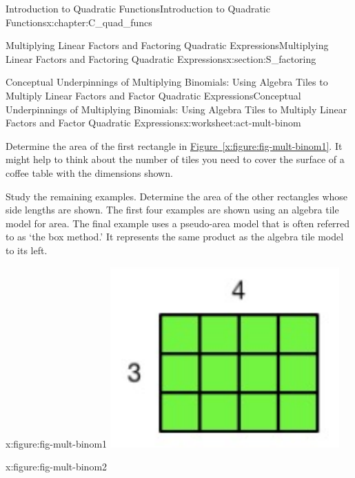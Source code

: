 \documentclass[oneside,10pt,]{book}
\newcommand{\xreffont}{\relax}
\numberwithin{equation}{chapter}
\begin{document}
\begin{chapterptx}{Introduction to Quadratic Functions}{}{Introduction to Quadratic Functions}{}{}{x:chapter:C_quad_funcs}
\begin{sectionptx}{Multiplying Linear Factors and Factoring Quadratic Expressions}{}{Multiplying Linear Factors and Factoring Quadratic Expressions}{}{}{x:section:S_factoring}
\begin{worksheet-subsection}{Conceptual Underpinnings of Multiplying Binomials: Using Algebra Tiles to Multiply Linear Factors and Factor Quadratic Expressions}{}{Conceptual Underpinnings of Multiplying Binomials: Using Algebra Tiles to Multiply Linear Factors and Factor Quadratic Expressions}{}{}{x:worksheet:act-mult-binom}
\begin{introduction}{}%
Determine the area of the first rectangle in \hyperref[x:figure:fig-mult-binom1]{Figure~{\xreffont\ref{x:figure:fig-mult-binom1}}}. It might help to think about the number of tiles you need to cover the surface of a coffee table with the dimensions shown.%
\par
Study the remaining examples. Determine the area of the other rectangles whose side lengths are shown. The first four examples are shown using an algebra tile model for area. The final example uses a pseudo-area model that is often referred to as `the box method.' It represents the same product as the algebra tile model to its left. \begin{sidebyside}{3}{0}{0}{0}%
\begin{sbspanel}{0.333333333333333}%
\begin{figureptx}{}{x:figure:fig-mult-binom1}{}%
\includegraphics[width=\linewidth]{external/mult-binom1.pdf}
\tcblower
\end{figureptx}%
\end{sbspanel}%
\begin{sbspanel}{0.333333333333333}%
\begin{figureptx}{}{x:figure:fig-mult-binom2}{}%

\end{figureptx}
\end{sbspanel}
\end{sidebyside}
\end{introduction}
\end{worksheet-subsection}
\end{sectionptx}
\end{chapterptx}
\end{document}

